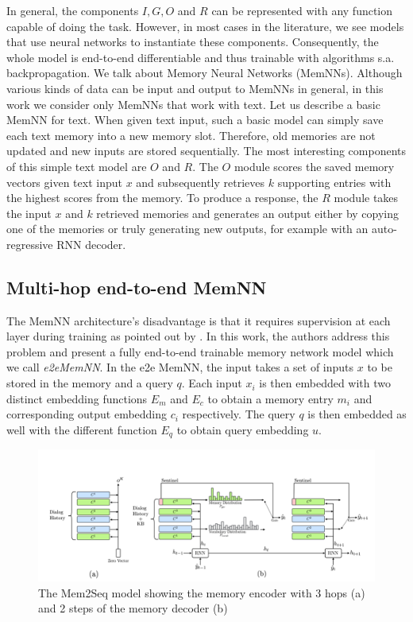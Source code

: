 In general, the components $I, G, O$ and $R$ can be represented with any function capable of doing the task.
However, in most cases in the literature, we see models that use neural networks to instantiate these components.
Consequently, the whole model is end-to-end differentiable and thus trainable with algorithms s.a. backpropagation.
We talk about Memory Neural Networks (MemNNs).
Although various kinds of data can be input and output to MemNNs in general, in this work we consider only MemNNs that work with text.
Let us describe a basic MemNN for text.
When given text input, such a basic model can simply save each text memory into a new memory slot.
Therefore, old memories are not updated and new inputs are stored sequentially.
The most interesting components of this simple text model are $O$ and $R$.
The $O$ module scores the saved memory vectors given text input $x$ and subsequently retrieves $k$ supporting entries with the highest scores from the memory.
To produce a response, the $R$ module takes the input $x$ and $k$ retrieved memories and generates an output either by copying one of the memories or truly generating new outputs, for example with an auto-regressive RNN decoder. 

\subsection{Multi-hop end-to-end MemNN}
The MemNN architecture's disadvantage is that it requires supervision at each layer during training as pointed out by \citet{sukhbaatar2015end}.
In this work, the authors address this problem and present a fully end-to-end trainable memory network model which we call \emph{e2eMemNN}.
In the e2e MemNN, the input takes a set of inputs $x$ to be stored in the memory and a query $q$.
Each input $x_i$ is then embedded with two distinct embedding functions $E_m$ and $E_c$ to obtain a memory entry $m_i$ and corresponding output embedding $c_i$ respectively.
The query $q$ is then embedded as well with the different function $E_q$ to obtain query embedding $u$.

\begin{figure}[t]
    \centering
    \includegraphics[width=\textwidth]{images/mem2seq.png}
    \caption{The Mem2Seq model \cite{madotto-etal-2018-mem2seq} showing the memory encoder with 3 hops (a) and 2 steps of the memory decoder (b) }
    \label{fig:mem2seq}
\end{figure}

